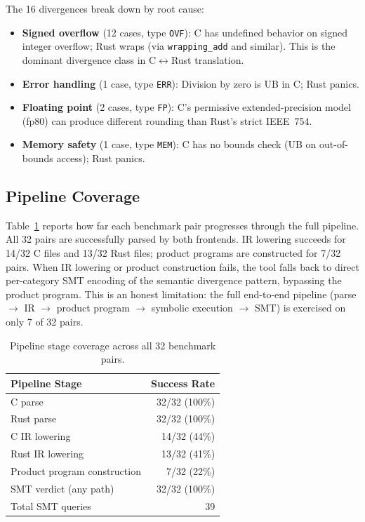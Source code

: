 \documentclass[11pt]{article}
\begin{document}
The 16 divergences break down by root cause:

\begin{itemize}[leftmargin=*]
  \item \textbf{Signed overflow} (12 cases, type \texttt{OVF}): C has undefined behavior on signed integer overflow; Rust wraps (via \texttt{wrapping\_add} and similar). This is the dominant divergence class in C$\leftrightarrow$Rust translation.
  \item \textbf{Error handling} (1 case, type \texttt{ERR}): Division by zero is UB in C; Rust panics.
  \item \textbf{Floating point} (2 cases, type \texttt{FP}): C's permissive extended-precision model (fp80) can produce different rounding than Rust's strict IEEE~754.
  \item \textbf{Memory safety} (1 case, type \texttt{MEM}): C has no bounds check (UB on out-of-bounds access); Rust panics.
\end{itemize}


\subsection{Pipeline Coverage}
\label{sec:eval-pipeline}

Table~\ref{tab:pipeline-coverage} reports how far each benchmark pair progresses through the full pipeline. All 32 pairs are successfully parsed by both frontends. IR lowering succeeds for 14/32 C files and 13/32 Rust files; product programs are constructed for 7/32 pairs. When IR lowering or product construction fails, the tool falls back to direct per-category SMT encoding of the semantic divergence pattern, bypassing the product program. This is an honest limitation: the full end-to-end pipeline (parse $\to$ IR $\to$ product program $\to$ symbolic execution $\to$ SMT) is exercised on only 7 of 32 pairs.

\begin{table}[H]
\centering
\caption{Pipeline stage coverage across all 32 benchmark pairs.}
\label{tab:pipeline-coverage}
\begin{tabular}{@{}lr@{}}
\toprule
Pipeline Stage & Success Rate \\
\midrule
C parse & 32/32 (100\%) \\
Rust parse & 32/32 (100\%) \\
C IR lowering & 14/32 (44\%) \\
Rust IR lowering & 13/32 (41\%) \\
Product program construction & 7/32 (22\%) \\
SMT verdict (any path) & 32/32 (100\%) \\
Total SMT queries & 39 \\
\bottomrule
\end{tabular}
\end{table}
\end{document}
